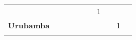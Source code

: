 \begin{tabular}{lccccccccc}
	&\cellcolor[HTML]{FCC46C}                   &\cellcolor[HTML]{FCC46C} 	  &\cellcolor[HTML]{FCC46C} 					&\cellcolor[HTML]{FCC46C} 					
	&\cellcolor[HTML]{FCC46C}					&1
	&\cellcolor[HTML]{FCC46C}					&\cellcolor[HTML]{FCC46C} 
	&\cellcolor[HTML]{FCC46C}\\
	\textbf{Urubamba}                                                    
    &\cellcolor[HTML]{FCC46C}                   &\cellcolor[HTML]{FCC46C} 		 			&\cellcolor[HTML]{FCC46C}					&\cellcolor[HTML]{FCC46C}      
	&\cellcolor[HTML]{FCC46C}					&\cellcolor[HTML]{FCC46C}		
	&\cellcolor[HTML]{FCC46C}					&1
	&\cellcolor[HTML]{FCC46C}\\
	&\multicolumn{1}{l}{}                       &\multicolumn{1}{l}{}            &\multicolumn{1}{l}{}                         
	&\multicolumn{1}{l}{}                       &\multicolumn{1}{l}{}            &\multicolumn{1}{l}{}                       &\multicolumn{1}{l}{}                       &\multicolumn{1}{l}{}            &\multicolumn{1}{l}{}    
\end{tabular}